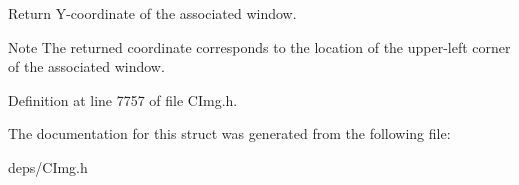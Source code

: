 Return Y-\/coordinate of the associated window. 

\begin{DoxyNote}{Note}
The returned coordinate corresponds to the location of the upper-\/left corner of the associated window. 
\end{DoxyNote}


Definition at line 7757 of file C\+Img.\+h.



The documentation for this struct was generated from the following file\+:\begin{DoxyCompactItemize}
\item 
deps/C\+Img.\+h\end{DoxyCompactItemize}
